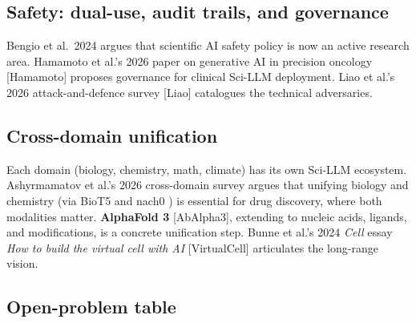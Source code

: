 \documentclass{article}
\begin{document}
\subsection{Safety: dual-use, audit trails, and governance}\label{safety-dual-use-audit-trails-and-governance}

Bengio et al.~2024 \cite{bengio2024internationalscien} argues that scientific AI safety policy is now an active research area. Hamamoto et al.'s 2026 paper on generative AI in precision oncology {[}Hamamoto{]} proposes governance for clinical Sci-LLM deployment. Liao et al.'s 2026 attack-and-defence survey {[}Liao{]} catalogues the technical adversaries.

\subsection{Cross-domain unification}\label{cross-domain-unification}

Each domain (biology, chemistry, math, climate) has its own Sci-LLM ecosystem. Ashyrmamatov et al.'s 2026 cross-domain survey \cite{ashyrmamatov2026asurveyonlargelang} argues that unifying biology and chemistry (via BioT5 \cite{pei2023emnlp2023} and nach0 \cite{livne2024nach0multimodalnat}) is essential for drug discovery, where both modalities matter. \textbf{AlphaFold 3} {[}AbAlpha3{]}, extending to nucleic acids, ligands, and modifications, is a concrete unification step. Bunne et al.'s 2024 \emph{Cell} essay \emph{How to build the virtual cell with AI} {[}VirtualCell{]} articulates the long-range vision.

\subsection{Open-problem table}\label{open-problem-table}
\end{document}
